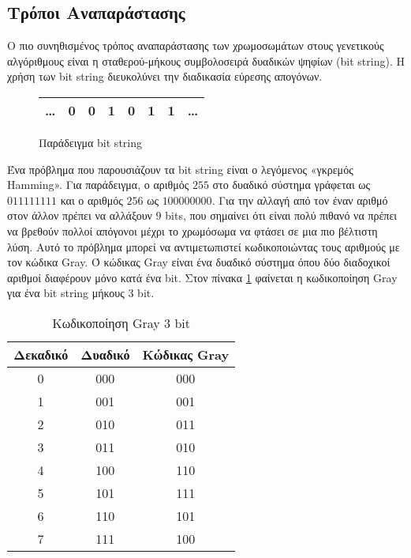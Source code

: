 \subsection{Τρόποι Αναπαράστασης}

Ο πιο συνηθισμένος τρόπος αναπαράστασης των χρωμοσωμάτων στους γενετικούς αλγόριθμους είναι η σταθερού-μήκους συμβολοσειρά δυαδικών ψηφίων (bit string). Η χρήση των bit string διευκολύνει την διαδικασία εύρεσης απογόνων.

\begin{figure}[!t]
    \renewcommand{\arraystretch}{1.3}
    \label{fig_bit_string}
    \centering
    \begin{tabular}{c|c|c|c|c|c|c|c}
        \hline
        \ldots & 0 & 0 & 1 & 0 & 1 & 1 & \ldots\\
        \hline
    \end{tabular}
    \caption{Παράδειγμα bit string}
\end{figure}

Ένα πρόβλημα που παρουσιάζουν τα bit string είναι ο λεγόμενος «γκρεμός Hamming». Για παράδειγμα, ο αριθμός $255$ στο δυαδικό σύστημα γράφεται ως $011111111$ και ο αριθμός $256$ ως $100000000$. Για την αλλαγή από τον έναν αριθμό στον άλλον πρέπει να αλλάξουν $9$ bits, που σημαίνει ότι είναι πολύ πιθανό να πρέπει να βρεθούν πολλοί απόγονοι μέχρι το χρωμόσωμα να φτάσει σε μια πιο βέλτιστη λύση. Αυτό το πρόβλημα μπορεί να αντιμετωπιστεί κωδικοποιώντας τους αριθμούς με τον κώδικα Gray. Ό κώδικας Gray είναι ένα δυαδικό σύστημα όπου δύο διαδοχικοί αριθμοί διαφέρουν μόνο κατά ένα bit. \cite{Lehre} Στον πίνακα \ref{table_gray_code} φαίνεται η κωδικοποίηση Gray για ένα bit string μήκους 3 bit.

\begin{table}[!t]
    \renewcommand{\arraystretch}{1.3}
    \caption{Κωδικοποίηση Gray 3 bit}
    \label{table_gray_code}
    \centering
    \begin{tabular}{c|c|c}
        \hline
        \bfseries Δεκαδικό & \bfseries Δυαδικό & \bfseries Κώδικας Gray\\
        \hline\hline
        0 & 000 & 000\\
        1 & 001 & 001\\
        2 & 010 & 011\\
        3 & 011 & 010\\
        4 & 100 & 110\\
        5 & 101 & 111\\
        6 & 110 & 101\\
        7 & 111 & 100\\
        \hline
    \end{tabular}
\end{table}

